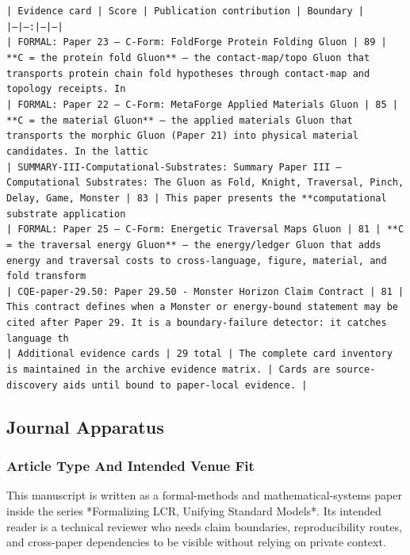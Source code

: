 \documentclass[11pt]{article}
\begin{document}
\noindent\texttt{| Evidence card | Score | Publication contribution | Boundary |}\\
\noindent\texttt{|---|---:|---|---|}\\
\noindent\texttt{| FORMAL: Paper 23 — C-Form: FoldForge Protein Folding Gluon | 89 | **C = the protein fold Gluon** — the contact-map/topo Gluon that transports protein chain fold hypotheses through contact-map and topology receipts. In }\\
\noindent\texttt{| FORMAL: Paper 22 — C-Form: MetaForge Applied Materials Gluon | 85 | **C = the material Gluon** — the applied materials Gluon that transports the morphic Gluon (Paper 21) into physical material candidates. In the lattic}\\
\noindent\texttt{| SUMMARY-III-Computational-Substrates: Summary Paper III — Computational Substrates: The Gluon as Fold, Knight, Traversal, Pinch, Delay, Game, Monster | 83 | This paper presents the **computational substrate application}\\
\noindent\texttt{| FORMAL: Paper 25 — C-Form: Energetic Traversal Maps Gluon | 81 | **C = the traversal energy Gluon** — the energy/ledger Gluon that adds energy and traversal costs to cross-language, figure, material, and fold transform}\\
\noindent\texttt{| CQE-paper-29.50: Paper 29.50 - Monster Horizon Claim Contract | 81 | This contract defines when a Monster or energy-bound statement may be cited after Paper 29. It is a boundary-failure detector: it catches language th}\\
\noindent\texttt{| Additional evidence cards | 29 total | The complete card inventory is maintained in the archive evidence matrix. | Cards are source-discovery aids until bound to paper-local evidence. |}\\

\subsection*{Journal Apparatus}

\subsubsection*{Article Type And Intended Venue Fit}

This manuscript is written as a formal-methods and mathematical-systems paper
inside the series *Formalizing LCR, Unifying Standard Models*. Its intended
reader is a technical reviewer who needs claim boundaries, reproducibility
routes, and cross-paper dependencies to be visible without relying on private
context.
\end{document}
